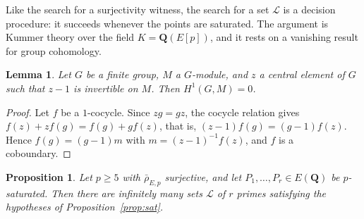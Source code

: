 \documentclass[11pt]{amsart}
\newtheorem{proposition}[theorem]{Proposition}
\newtheorem{lemma}[theorem]{Lemma}
\theoremstyle{definition}
\newcommand{\Q}{\mathbf{Q}}
\newcommand{\rhobar}{\bar\rho_{E,p}}
\begin{document}
Like the search for a surjectivity witness, the search for a set $\mathcal L$ is a decision procedure: it succeeds whenever the points are saturated. The argument is Kummer theory over the field $K=\Q(E[p])$, and it rests on a vanishing result for group cohomology.

\begin{lemma}\label{lem:sah}
Let $G$ be a finite group, $M$ a $G$-module, and $z$ a central element of $G$ such that $z-1$ is invertible on $M$. Then $H^1(G,M)=0$.
\end{lemma}

\begin{proof}
Let $f$ be a $1$-cocycle. Since $zg=gz$, the cocycle relation gives $f(z)+zf(g)=f(g)+gf(z)$, that is, $(z-1)f(g)=(g-1)f(z)$. Hence $f(g)=(g-1)m$ with $m=(z-1)^{-1}f(z)$, and $f$ is a coboundary.
\end{proof}

\begin{proposition}\label{prop:satexist}
Let $p\ge5$ with $\rhobar$ surjective, and let $P_1,\dots,P_r\in E(\Q)$ be $p$-saturated. Then there are infinitely many sets $\mathcal L$ of $r$ primes satisfying the hypotheses of Proposition~\ref{prop:sat}.
\end{proposition}
\end{document}
